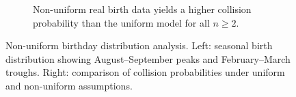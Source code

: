 \documentclass[12pt]{report}
\theoremstyle{definition}
\begin{document}
\begin{figure}[ht]
\begin{subfigure}[t]{0.48\textwidth}
    \caption{Non-uniform real birth data yields a higher collision probability than
             the uniform model for all $n \ge 2$.}
  \end{subfigure}
  \caption{Non-uniform birthday distribution analysis.  Left: seasonal birth
           distribution showing August–September peaks and February–March troughs.
           Right: comparison of collision probabilities under uniform and non-uniform
           assumptions.}
  \label{fig:nonuniform}
\end{figure}

\end{document}
